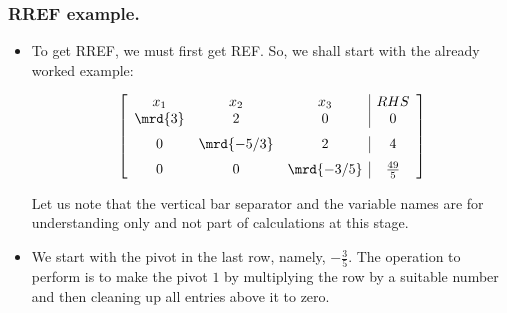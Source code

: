 
\begin{frame}%
  \frametitle{RREF example.}
  \begin{itemize}%
 
\item To get RREF, we must first get REF. So, we shall start with the
already worked example:

$$\left[ \begin {array}{ccc|c}
x_1 & x_2 & x_3 & RHS\\
\mrd{3}&2&0&0\\\noalign{\medskip}
0&\mrd{-5/3}&2&4\\\noalign{\medskip}
0&0&\mrd{-3/5}&{\frac {49}{5}}\end {array} \right]
$$

Let us note that the vertical bar separator and the variable names are
for understanding only and not part of calculations at this stage.

\item We start with the pivot in the last row, namely, $-\frac{3}{5}$.
The operation to perform is to make the pivot $1$ by multiplying the row by
a suitable number and then cleaning up all entries above it to zero.



\end{itemize}
\end{frame}


